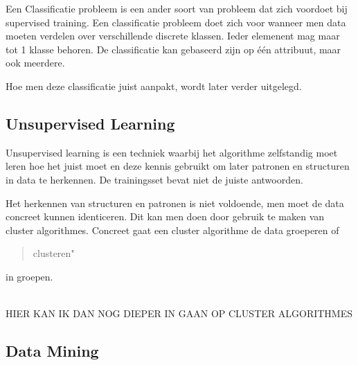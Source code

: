 Een Classificatie probleem is een ander soort van probleem dat zich voordoet bij supervised training. Een classificatie probleem doet zich voor wanneer men data moeten verdelen over verschillende discrete klassen. Ieder elemenent mag maar tot 1 klasse behoren. De classificatie kan gebaseerd zijn op één attribuut, maar ook meerdere.

Hoe men deze classificatie juist aanpakt, wordt later verder uitgelegd.

\subsection{Unsupervised Learning}\label{Unsupervised Learning}

Unsupervised learning is een techniek waarbij het algorithme zelfstandig moet leren hoe het juist moet en deze kennis gebruikt om later patronen en structuren in data te herkennen. De trainingsset bevat niet de juiste antwoorden.

Het herkennen van structuren en patronen is niet voldoende, men moet de data concreet kunnen identiceren. Dit kan men doen door gebruik te maken van cluster algorithmes. Concreet gaat een cluster algorithme de data groeperen of \begin{quote}clusteren"\end{quote} in groepen.

\\
HIER KAN IK DAN NOG DIEPER IN GAAN OP CLUSTER ALGORITHMES
\\

\subsection{Data Mining}\label{Data Mining}

